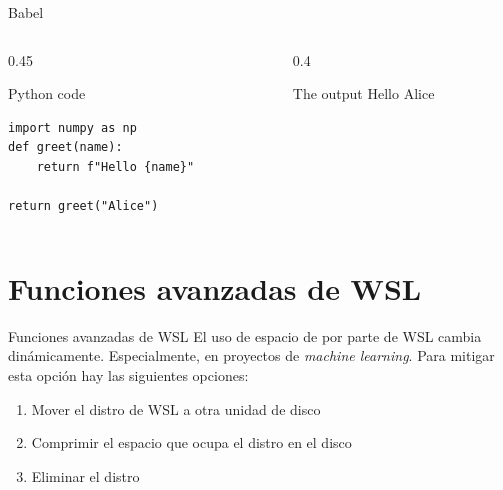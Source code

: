 \documentclass[presentation]{beamer}
\begin{document}
\begin{frame}[label={sec:org31a1f4d},fragile]{Babel}
 \begin{columns}
\begin{column}{0.45\columnwidth}
\begin{block}{Python code}
\begin{verbatim}
import numpy as np
def greet(name):
    return f"Hello {name}"

return greet("Alice")
\end{verbatim}
\end{block}
\end{column}

\begin{column}{0.4\columnwidth}
\begin{block}{The output}
Hello Alice
\end{block}
\end{column}
\end{columns}
\end{frame}

\section{Funciones avanzadas de WSL}
\label{sec:org3b917ca}

\begin{frame}[label={sec:org622dc5f}]{Funciones avanzadas de WSL}
El uso de espacio de por parte de WSL cambia
dinámicamente. Especialmente, en proyectos de \emph{machine learning}. Para
mitigar esta opción hay las siguientes opciones:

\begin{enumerate}
\item Mover el distro de WSL a otra unidad de disco
\item Comprimir el espacio que ocupa el distro en el disco
\item Eliminar el distro
\end{enumerate}
\end{frame}
\end{document}
